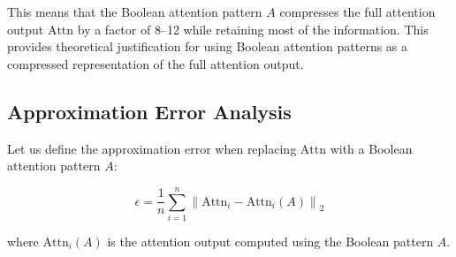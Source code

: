 This means that the Boolean attention pattern $A$ compresses the full attention output $\text{Attn}$ by a factor of 8–12 while retaining most of the information. This provides theoretical justification for using Boolean attention patterns as a compressed representation of the full attention output.













\subsection{Approximation Error Analysis}













Let us define the approximation error when replacing $\text{Attn}$ with a Boolean attention pattern $A$:






$$






\epsilon = \frac{1}{n} \sum_{i=1}^n \left\| \text{Attn}_i - \text{Attn}_i(A) \right\|_2






$$






where $\text{Attn}_i(A)$ is the attention output computed using the Boolean pattern $A$.













